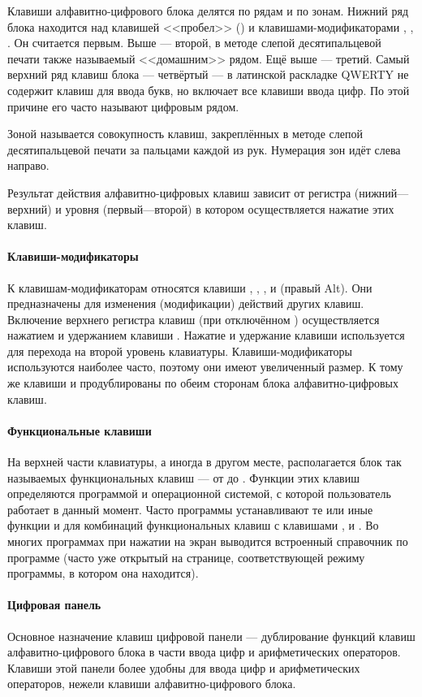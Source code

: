 Клавиши алфавитно-цифрового блока делятся по рядам и по зонам.
Нижний ряд блока находится над клавишей <<пробел>> (\Spacebar) и клавишами-модификаторами \Ctrl, \Alt, \AltGr.
Он считается первым.
Выше --- второй, в методе слепой десятипальцевой печати также называемый <<домашним>> рядом.
Ещё выше --- третий.
Самый верхний ряд клавиш блока --- четвёртый --- в латинской раскладке QWERTY не содержит клавиш для ввода букв, но включает все клавиши ввода цифр.
По этой причине его часто называют цифровым рядом.

Зоной называется совокупность клавиш, закреплённых в методе слепой десятипальцевой печати за пальцами каждой из рук.
Нумерация зон идёт слева направо.

Результат действия алфавитно-цифровых клавиш зависит от регистра (нижний---верхний) и уровня (первый---второй) в котором осуществляется нажатие этих клавиш.

\paragraph{Клавиши-модификаторы}
К клавишам-модификаторам относятся клавиши \Shift, \Ctrl, , \Alt и \AltGr (правый Alt).
Они предназначены для изменения (модификации) действий других клавиш.
Включение верхнего регистра клавиш (при отключённом ) осуществляется нажатием и удержанием клавиши \Shift. Нажатие и удержание клавиши \AltGr используется для перехода на второй уровень клавиатуры.
Клавиши-модификаторы используются наиболее часто, поэтому они имеют увеличенный размер.
К тому же клавиши \Shift и \Ctrl продублированы по обеим сторонам блока алфавитно-цифровых клавиш.

\paragraph{Функциональные клавиши}
На верхней части клавиатуры, а иногда в другом месте, располагается блок так называемых функциональных клавиш --- от  до .
Функции этих клавиш определяются программой и операционной системой, с которой пользователь работает в данный момент.
Часто программы устанавливают те или иные функции и для комбинаций функциональных клавиш с клавишами \Shift, \Ctrl и \Alt.
Во многих программах при нажатии  на экран выводится встроенный справочник по программе (часто уже открытый на странице, соответствующей режиму программы, в котором она находится).

\paragraph{Цифровая панель}
Основное назначение клавиш цифровой панели --- дублирование функций клавиш алфавитно-цифрового блока в части ввода цифр и арифметических операторов.
Клавиши этой панели более удобны для ввода цифр и арифметических операторов, нежели клавиши алфавитно-цифрового блока.

